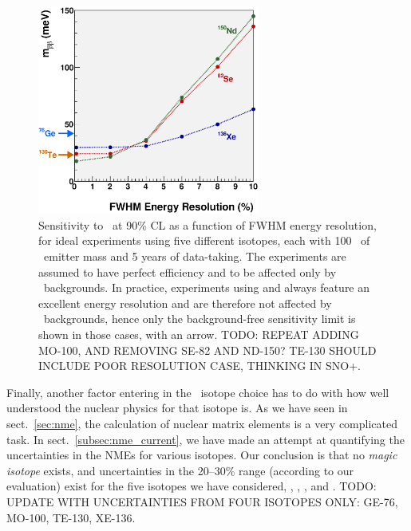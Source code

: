 \begin{figure}[t!b!]
\begin{center}
\includegraphics[width=0.65\textwidth]{img/mbbversusenergyres.eps}
\end{center}
\caption{\label{fig:twonubgr}Sensitivity to \mbb\ at 90\% CL as a function of FWHM energy resolution, for ideal experiments using five different isotopes, each with 100 \kgbb\ of \bb\ emitter mass and 5 years of data-taking. The experiments are assumed to have perfect efficiency and to be affected only by \bbtnu\ backgrounds. In practice, experiments using  and  always feature an excellent energy resolution and are therefore not affected by \bbtnu\ backgrounds, hence only the background-free sensitivity limit is shown in those cases, with an arrow. TODO: REPEAT ADDING MO-100, AND REMOVING SE-82 AND ND-150? TE-130 SHOULD INCLUDE POOR RESOLUTION CASE, THINKING IN SNO+.}  
\end{figure}

Finally, another factor entering in the \bb\ isotope choice has to do with how well understood the nuclear physics for that isotope is. As we have seen in sect.~\ref{sec:nme}, the calculation of nuclear matrix elements is a very complicated task. In sect.~\ref{subsec:nme_current}, we have made an attempt at quantifying the uncertainties in the NMEs for various isotopes. Our conclusion is that no \emph{magic isotope} exists, and uncertainties in the 20--30\% range (according to our evaluation) exist for the five isotopes we have considered, , , ,  and . TODO: UPDATE WITH UNCERTAINTIES FROM FOUR ISOTOPES ONLY: GE-76, MO-100, TE-130, XE-136.  



